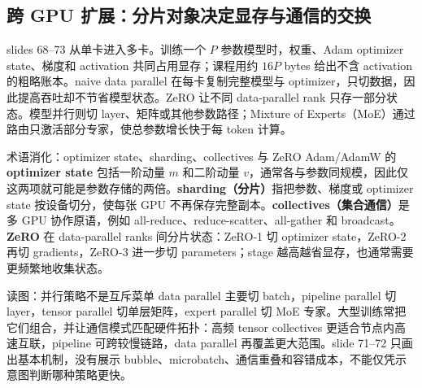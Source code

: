 \subsection{跨 GPU 扩展：分片对象决定显存与通信的交换}

slides 68--73 从单卡进入多卡。训练一个 $P$ 参数模型时，权重、Adam optimizer state、梯度和 activation 共同占用显存；课程用约 $16P$ bytes 给出不含 activation 的粗略账本。naive data parallel 在每卡复制完整模型与 optimizer，只切数据，因此提高吞吐却不节省模型状态。ZeRO 让不同 data-parallel rank 只存一部分状态。模型并行则切 layer、矩阵或其他参数路径；Mixture of Experts（MoE）通过路由只激活部分专家，使总参数增长快于每 token 计算。


\begin{knowledgebox}{术语消化：optimizer state、sharding、collectives 与 ZeRO}
Adam/AdamW 的 \textbf{optimizer state} 包括一阶动量 $m$ 和二阶动量 $v$，通常各与参数同规模，因此仅这两项就可能是参数存储的两倍。\textbf{sharding（分片）}指把参数、梯度或 optimizer state 按设备切分，使每张 GPU 不再保存完整副本。\textbf{collectives（集合通信）}是多 GPU 协作原语，例如 all-reduce、reduce-scatter、all-gather 和 broadcast。\textbf{ZeRO} 在 data-parallel ranks 间分片状态：ZeRO-1 切 optimizer state，ZeRO-2 再切 gradients，ZeRO-3 进一步切 parameters；stage 越高越省显存，也通常需要更频繁地收集状态。
\end{knowledgebox}

\begin{knowledgebox}{读图：并行策略不是互斥菜单}
data parallel 主要切 batch，pipeline parallel 切 layer，tensor parallel 切单层矩阵，expert parallel 切 MoE 专家。大型训练常把它们组合，并让通信模式匹配硬件拓扑：高频 tensor collectives 更适合节点内高速互联，pipeline 可跨较慢链路，data parallel 再覆盖更大范围。slide 71--72 只画出基本机制，没有展示 bubble、microbatch、通信重叠和容错成本，不能仅凭示意图判断哪种策略更快。
\end{knowledgebox}


